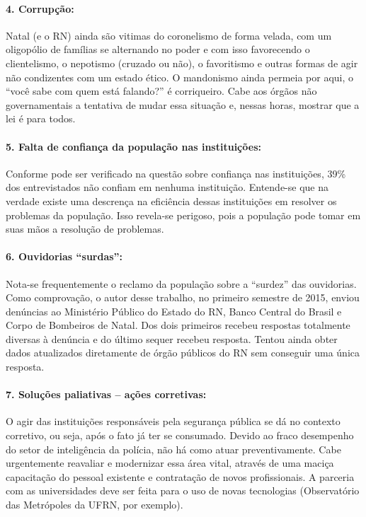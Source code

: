\documentclass[
	12pt,				%
	openright,			%
	twoside,			%
	a4paper,			%
	chapter=TITLE,		%
	section=TITLE,		%
	subsection=TITLE,	%
	subsubsection=TITLE,%
	spanish,            %
	english,			%
	brazil				%
	]{abntex2}
\begin{document}
\paragraph*{\textbf{4. Corrupção:}} Natal (e o RN) ainda são vitimas do coronelismo de forma velada, com um oligopólio de famílias se alternando no poder e com isso favorecendo o clientelismo, o nepotismo (cruzado ou não), o favoritismo e outras formas de agir não condizentes com um estado ético. O mandonismo ainda permeia por aqui, o “você sabe com quem está falando?” é corriqueiro. Cabe aos órgãos não governamentais a tentativa de mudar essa situação e, nessas horas, mostrar que a lei é para todos.
\hypertarget{W5}{}
\paragraph*{\textbf{5. Falta de confiança da população nas instituições:}} Conforme pode ser verificado na questão sobre confiança nas instituições, 39\% dos entrevistados não confiam em nenhuma instituição. Entende-se que na verdade existe uma descrença na eficiência dessas instituições em resolver os problemas da população. Isso revela-se perigoso, pois a população pode tomar em suas mãos a resolução de problemas.
\hypertarget{W6}{}
\paragraph*{\textbf{6. Ouvidorias “surdas”:}} Nota-se frequentemente o reclamo da população sobre a “surdez” das ouvidorias. Como comprovação, o autor desse trabalho, no primeiro semestre de 2015, enviou denúncias ao Ministério Público do Estado do RN, Banco Central do Brasil e Corpo de Bombeiros de Natal. Dos dois primeiros recebeu respostas totalmente diversas à denúncia e do último sequer recebeu resposta. Tentou
ainda obter dados atualizados diretamente de órgão públicos do RN sem conseguir uma única resposta.
\hypertarget{W7}{}
\paragraph*{\textbf{7. Soluções paliativas – ações corretivas:}} O agir das instituições responsáveis pela segurança pública se dá no contexto corretivo, ou seja, após o fato já ter se consumado. Devido ao fraco desempenho do setor de inteligência da polícia, não há como atuar preventivamente. Cabe urgentemente reavaliar e modernizar  essa área vital, através de uma maciça capacitação do pessoal existente e contratação de novos profissionais. A parceria com as universidades deve ser feita para o uso de novas tecnologias (Observatório das Metrópoles da UFRN, por exemplo).
\hypertarget{W8}{}
\end{document}
